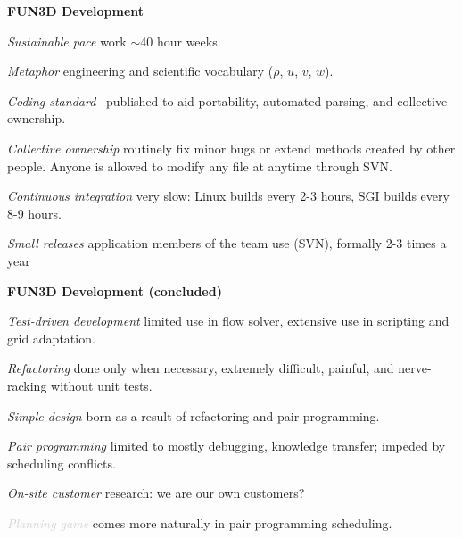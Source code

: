 \documentclass[landscape]{slides}
\renewcommand{\title}[1]{{\large\bfseries #1}}
\newenvironment{itemiz}%
  {\begin{list}{}{\raggedright
      \setlength{\itemsep}{2pt}%
      \setlength{\parskip}{4pt}\setlength{\parsep}{2pt}}}%
  {\end{list}}%
\begin{document}
 \begin{slide}
  \title{FUN3D Development}
  \begin{itemiz}
    \item[\textit{Sustainable pace}]
      {\small work $\sim$40 hour weeks.}
    \item[\textit{Metaphor}]
      {\small engineering and scientific vocabulary ($\rho$, $u$, $v$, $w$).}
    \item[\textit{Coding standard}]
      {\small\ published to aid portability, automated parsing,
               and collective ownership.}
    \item[\textit{Collective ownership}]
      {\small routinely fix minor bugs or extend methods created 
	by other people. Anyone is allowed to modify any file at 
	anytime through SVN.}
    \item[\textit{Continuous integration}]
      {\small very slow: Linux builds every 2-3 hours, 
	SGI builds every 8-9 hours.}
    \item[\textcolor{mediumGray}{\textit{Small releases}}]
      {\small application members of the team use (SVN), 
              formally 2-3 times a year}
   \end{itemiz}
 \end{slide}
  
 \begin{slide}
  \title{FUN3D Development \small(concluded)}
  \begin{itemiz}
    \item[\textcolor{mediumGray}{\textit{Test-driven development}}]
      {\small limited use in flow solver, 
	extensive use in scripting and grid adaptation.}
    \item[\textcolor{mediumGray}{\textit{Refactoring}}]
      {\small done only when necessary, extremely difficult, 
	painful, and nerve-racking without unit tests.}
    \item[\textcolor{mediumGray}{\textit{Simple design}}]
      {\small born as a result of refactoring and pair programming.}
    \item[\textcolor{mediumGray}{\textit{Pair programming}}]
      {\small limited to mostly debugging, knowledge transfer; 
	impeded by scheduling conflicts. }
    \item[\textcolor{mediumGray}{\textit{On-site customer}}]
      {\small research: we are our own customers?}  
    \item[\textcolor{lightGray}{\textit{Planning game}}]
      {\small comes more naturally in pair programming scheduling. }
  \end{itemiz}
 \end{slide}
\end{document}
